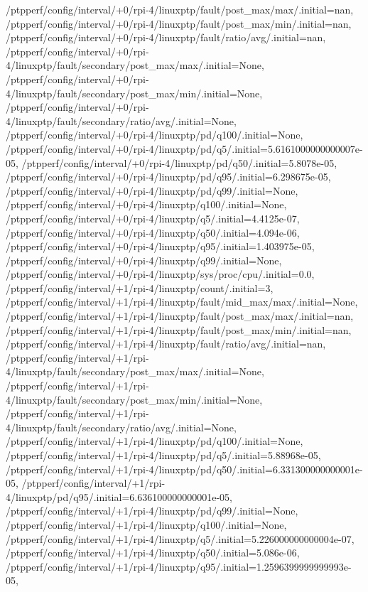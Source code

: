 {    /ptpperf/config/interval/+0/rpi-4/linuxptp/fault/post_max/max/.initial=nan,
    /ptpperf/config/interval/+0/rpi-4/linuxptp/fault/post_max/min/.initial=nan,
    /ptpperf/config/interval/+0/rpi-4/linuxptp/fault/ratio/avg/.initial=nan,
    /ptpperf/config/interval/+0/rpi-4/linuxptp/fault/secondary/post_max/max/.initial=None,
    /ptpperf/config/interval/+0/rpi-4/linuxptp/fault/secondary/post_max/min/.initial=None,
    /ptpperf/config/interval/+0/rpi-4/linuxptp/fault/secondary/ratio/avg/.initial=None,
    /ptpperf/config/interval/+0/rpi-4/linuxptp/pd/q100/.initial=None,
    /ptpperf/config/interval/+0/rpi-4/linuxptp/pd/q5/.initial=5.6161000000000007e-05,
    /ptpperf/config/interval/+0/rpi-4/linuxptp/pd/q50/.initial=5.8078e-05,
    /ptpperf/config/interval/+0/rpi-4/linuxptp/pd/q95/.initial=6.298675e-05,
    /ptpperf/config/interval/+0/rpi-4/linuxptp/pd/q99/.initial=None,
    /ptpperf/config/interval/+0/rpi-4/linuxptp/q100/.initial=None,
    /ptpperf/config/interval/+0/rpi-4/linuxptp/q5/.initial=4.4125e-07,
    /ptpperf/config/interval/+0/rpi-4/linuxptp/q50/.initial=4.094e-06,
    /ptpperf/config/interval/+0/rpi-4/linuxptp/q95/.initial=1.403975e-05,
    /ptpperf/config/interval/+0/rpi-4/linuxptp/q99/.initial=None,
    /ptpperf/config/interval/+0/rpi-4/linuxptp/sys/proc/cpu/.initial=0.0,
    /ptpperf/config/interval/+1/rpi-4/linuxptp/count/.initial=3,
    /ptpperf/config/interval/+1/rpi-4/linuxptp/fault/mid_max/max/.initial=None,
    /ptpperf/config/interval/+1/rpi-4/linuxptp/fault/post_max/max/.initial=nan,
    /ptpperf/config/interval/+1/rpi-4/linuxptp/fault/post_max/min/.initial=nan,
    /ptpperf/config/interval/+1/rpi-4/linuxptp/fault/ratio/avg/.initial=nan,
    /ptpperf/config/interval/+1/rpi-4/linuxptp/fault/secondary/post_max/max/.initial=None,
    /ptpperf/config/interval/+1/rpi-4/linuxptp/fault/secondary/post_max/min/.initial=None,
    /ptpperf/config/interval/+1/rpi-4/linuxptp/fault/secondary/ratio/avg/.initial=None,
    /ptpperf/config/interval/+1/rpi-4/linuxptp/pd/q100/.initial=None,
    /ptpperf/config/interval/+1/rpi-4/linuxptp/pd/q5/.initial=5.88968e-05,
    /ptpperf/config/interval/+1/rpi-4/linuxptp/pd/q50/.initial=6.331300000000001e-05,
    /ptpperf/config/interval/+1/rpi-4/linuxptp/pd/q95/.initial=6.636100000000001e-05,
    /ptpperf/config/interval/+1/rpi-4/linuxptp/pd/q99/.initial=None,
    /ptpperf/config/interval/+1/rpi-4/linuxptp/q100/.initial=None,
    /ptpperf/config/interval/+1/rpi-4/linuxptp/q5/.initial=5.226000000000004e-07,
    /ptpperf/config/interval/+1/rpi-4/linuxptp/q50/.initial=5.086e-06,
    /ptpperf/config/interval/+1/rpi-4/linuxptp/q95/.initial=1.2596399999999993e-05,
}
